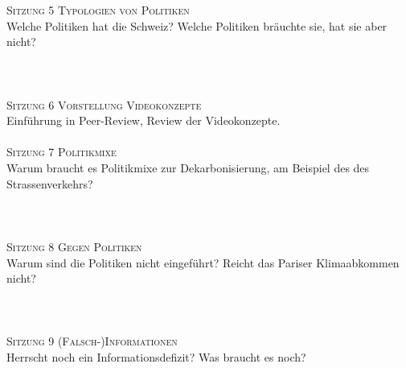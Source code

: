 \documentclass[12pt,a4paper]{article}
\begin{document}
\textsc{Sitzung 5 \dotfill Typologien von Politiken}  \smallskip \\ 
{\color{darkgreen}{\Rectangle}} Welche Politiken hat die Schweiz? Welche Politiken bräuchte sie, hat sie aber nicht? \\
{\color{darkgreen}{\Rectangle}} \\
{\color{darkgreen}{\Rectangle}} \\
\medskip  \\	

\textsc{Sitzung 6 \dotfill Vorstellung Videokonzepte} \smallskip \\ 
{\color{darkgreen}{\Rectangle}} Einführung in Peer-Review, Review der Videokonzepte.\\
\medskip  \\	

\clearpage
\textsc{Sitzung 7 \dotfill Politikmixe} \smallskip \\ 
{\color{darkgreen}{\Rectangle}} Warum braucht es Politikmixe zur Dekarbonisierung, am Beispiel des des Strassenverkehrs? \\ 
{\color{darkgreen}{\Rectangle}}  \\  
{\color{darkgreen}{\Rectangle}}  \\  
\medskip  \\	


\textsc{Sitzung 8 \dotfill Gegen Politiken}  \smallskip \\ 
{\color{darkgreen}{\Rectangle}}  Warum sind die Politiken nicht eingeführt? Reicht das Pariser Klimaabkommen nicht? \\%
{\color{darkgreen}{\Rectangle}}  \\
{\color{darkgreen}{\Rectangle}}  \\  
\medskip  \\	


\textsc{Sitzung 9 \dotfill (Falsch-)Informationen}  \smallskip \\ 
{\color{darkgreen}{\Rectangle}} Herrscht noch ein Informationsdefizit? Was braucht es noch? \\
{\color{darkgreen}{\Rectangle}}  \\
{\color{darkgreen}{\Rectangle}}  \\
{\color{darkgreen}{\Rectangle}}  \\
\medskip  \\	
\end{document}
